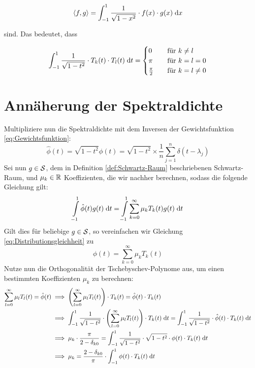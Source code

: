 $$\left \langle f, g \right \rangle = \int_{-1}^1 \frac{1}{\sqrt{1 - x^2}} \cdot f(x) \cdot g(x) \;\mathrm{d}x$$

sind. Das bedeutet, dass

$$\int_{-1}^1 \frac{1}{\sqrt{1 - t^2}} \cdot T_k(t) \cdot T_l(t) \;\mathrm{d}t =
\begin{cases}
    0               & \quad \text{für } k \neq l\\
    \pi             & \quad \text{für } k = l = 0\\
    \frac{\pi}{2}   & \quad \text{für } k = l \neq 0
\end{cases}$$

\section{Annäherung der Spektraldichte}
Multipliziere nun die Spektraldichte mit dem Inversen der Gewichtsfunktion \ref{eq:Gewichtsfunktion}:
$$\hat{\phi}(t) = \sqrt{1 - t^2} \phi(t) = \sqrt{1 - t^2} \times \frac{1}{n} \sum_{j = 1}^n \delta(t - \lambda_j)$$
Sei nun $g \in \mathcal{S}$, dem in Definition \ref{def:Schwartz-Raum} beschriebenen Schwartz-Raum,
und $\mu_k \in \mathbb{R}$ Koeffizienten,
die wir nachher berechnen, sodass die folgende Gleichung gilt:
\begin{equation} \label{eq:Distributionsgleichheit}
    \int \limits_{-1}^1 \hat{\phi}(t) g(t) \;\mathrm{d}t = \int \limits_{-1}^1 \sum_{k = 0}^{\infty} \mu_k T_k(t) g(t) \;\mathrm{d}t
\end{equation}
Gilt dies für beliebige $g \in \mathcal{S}$, so vereinfachen wir Gleichung \ref{eq:Distributionsgleichheit} zu
\begin{equation} \label{eq:Tschebyschev-Erweiterung}
    \hat{\phi}(t) = \sum_{k = 0}^{\infty} \mu_k T_k(t)
\end{equation}
Nutze nun die Orthogonalität der Tschebyschev-Polynome aus, um einen bestimmten Koeffizienten $\mu_k$ zu berechnen:
\begin{align*}
    \sum_{l = 0}^{\infty} \mu_l T_l(t) = \hat{\phi}(t) & \implies \left(\sum_{l = 0}^{\infty} \mu_l T_l(t)\right) \cdot T_k(t) = \hat{\phi}(t) \cdot T_k(t)\\
    & \implies \int_{-1}^1 \frac{1}{\sqrt{1 - t^2}} \cdot \left(\sum_{l = 0}^{\infty} \mu_l T_l(t)\right) \cdot T_k(t) \;\mathrm{d}t = \int_{-1}^1 \frac{1}{\sqrt{1 - t^2}} \cdot \hat{\phi}(t) \cdot T_k(t) \;\mathrm{d}t\\
    & \implies \mu_k \cdot \frac{\pi}{2 - \delta_{k0}} = \int_{-1}^1 \frac{1}{\sqrt{1 - t^2}} \cdot \sqrt{1 - t^2} \cdot \phi(t) \cdot T_k(t) \;\mathrm{d}t\\
    & \implies \mu_k = \frac{2 - \delta_{k0}}{\pi} \cdot \int_{-1}^1 \phi(t) \cdot T_k(t) \;\mathrm{d}t\\
\end{align*}

